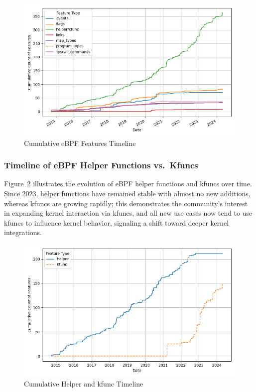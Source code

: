 \begin{figure}[ht]
    \centering
    \includegraphics[width=\linewidth]{feature-analysis/cumulative_bpf_features_timeline.png}
    \caption{Cumulative eBPF Features Timeline}
    \label{fig:cumulative_feature_timeline}
\end{figure}

\subsubsection{Timeline of eBPF Helper Functions vs.\ Kfuncs}

Figure~\ref{fig:cumulative_helper_kfunc_timeline} illustrates the evolution of eBPF helper functions and kfuncs over time. Since 2023, helper functions have remained stable with almost no new additions, whereas kfuncs are growing rapidly; this demonstrates the community's interest in expanding kernel interaction via kfuncs, and all new use cases now tend to use kfuncs to influence kernel behavior, signaling a shift toward deeper kernel integrations.

\begin{figure}[ht]
    \centering
    \includegraphics[width=\linewidth]{feature-analysis/cumulative_helper_kfunc_timeline.png}
    \caption{Cumulative Helper and kfunc Timeline}
    \label{fig:cumulative_helper_kfunc_timeline}
\end{figure}

